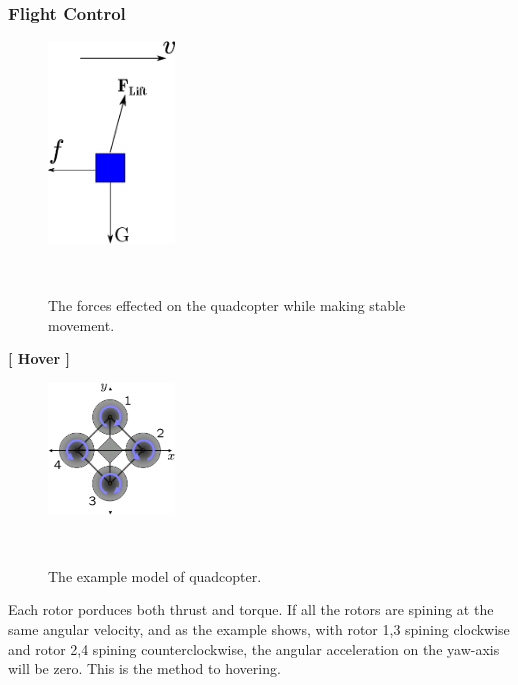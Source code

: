 \subsubsection{Flight Control}
\begin{figure}[h!]
  
  \centering
    \includegraphics[width=0.3\textwidth]{./Pictures/flying.eps}
    \caption{The forces effected on the quadcopter while making stable movement.}\\
\end{figure}
\textbf{[ Hover ]}
\begin{figure}[H]
  
  \centering
    \includegraphics[width=0.3\textwidth]{./Pictures/Quadrotor_yaw_torque.png}
    \caption{The example model of quadcopter.}\\
\end{figure}


Each rotor porduces both thrust and torque. If all the rotors are spining at the same angular velocity, and as the example shows, with rotor 1,3 spining clockwise and rotor 2,4 spining counterclockwise, the angular acceleration on the yaw-axis will be zero. 
This is the method to hovering.

